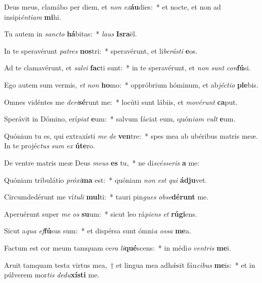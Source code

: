 \item Deus meus, clamábo per diem, et \textit{non} \textit{ex}\textbf{áu}dies:~* et nocte, et non ad insipi\textit{én}\textit{ti}\textit{am} \textbf{mi}hi.
\item Tu autem in \textit{sanc}\textit{to} \textbf{há}bitas:~* \textit{laus} \textbf{Is}\textbf{ra}ël.
\item In te speravérunt \textit{pa}\textit{tres} \textbf{nos}tri:~* speravérunt, et li\textit{be}\textit{rás}\textit{ti} \textbf{e}os.
\item Ad te clamavérunt, et \textit{sal}\textit{vi} \textbf{fac}ti sunt:~* in te speravérunt, et \textit{non} \textit{sunt} \textit{con}\textbf{fú}si.
\item Ego autem sum vermis, \textit{et} \textit{non} \textbf{ho}mo:~* oppróbrium hóminum, et ab\textit{jéc}\textit{ti}\textit{o} \textbf{ple}bis.
\item Omnes vidéntes me \textit{de}\textit{ri}\textbf{sé}runt me:~* locúti sunt lábiis, et \textit{mo}\textit{vé}\textit{runt} \textbf{ca}put.
\item Sperávit in Dómino, erí\textit{pi}\textit{at} \textbf{e}um:~* salvum fáciat eum, quón\textit{i}\textit{am} \textit{vult} \textbf{e}um.
\item Quóniam tu es, qui extraxísti \textit{me} \textit{de} \textbf{ven}tre:~* spes mea ab ubéribus matris meæ. In te projéc\textit{tus} \textit{sum} \textit{ex} \textbf{ú}\textbf{te}ro.
\item De ventre matris meæ Deus \textit{me}\textit{us} \textbf{es} tu,~* ne di\textit{scés}\textit{se}\textit{ris} \textbf{a} me:
\item Quóniam tribulátio \textit{pró}\textit{xi}\textbf{ma} est:~* quóniam \textit{non} \textit{est} \textit{qui} \textbf{ád}\textbf{ju}vet.
\item Circumdedérunt me ví\textit{tu}\textit{li} \textbf{mul}ti:~* tauri pin\textit{gues} \textit{ob}\textit{se}\textbf{dé}\textbf{runt} me.
\item Aperuérunt super \textit{me} \textit{os} \textbf{su}um:~* sicut leo rá\textit{pi}\textit{ens} \textit{et} \textbf{rú}\textbf{gi}ens.
\item Sicut a\textit{qua} \textit{ef}\textbf{fú}sus sum:~* et dispérsa sunt ómni\textit{a} \textit{os}\textit{sa} \textbf{me}a.
\item Factum est cor meum tamquam ce\textit{ra} \textit{li}\textbf{qué}scens:~* in médi\textit{o} \textit{ven}\textit{tris} \textbf{me}i.
\item Aruit tamquam testa virtus mea,~† et lingua mea adhǽsit fáu\textit{ci}\textit{bus} \textbf{me}is:~* et in púlverem mor\textit{tis} \textit{de}\textit{du}\textbf{xís}\textbf{ti} me.
